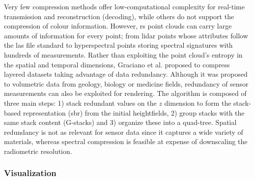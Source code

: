 Very few compression methods offer low-computational complexity for real-time transmission \cite{cao_3d_2019} and reconstruction (decoding), while others do not support the compression of colour information. However, \acrshort{rs} point clouds can carry large amounts of information for every point; from \acrshort{lidar} points whose attributes follow the \acrshort{las} file standard to hyperspectral points storing spectral signatures with hundreds of measurements. Rather than exploiting the point cloud's entropy in the spatial and temporal dimensions, Graciano et al. \cite{graciano_quadstack_2021} proposed to compress layered datasets taking advantage of data redundancy. Although it was proposed to volumetric data from geology, biology or medicine fields, redundancy of sensor measurements can also be exploited for rendering. The algorithm is composed of three main steps: 1) stack redundant values on the $\textit{z}$ dimension to form the stack-based representation (\acrshort{sbr}) from the initial heightfields, 2) group stacks with the same stack content (G-stacks) and 3) organize these into a quad-tree. Spatial redundancy is not as relevant for sensor data since it captures a wide variety of materials, whereas spectral compression is feasible at expense of downscaling the radiometric resolution. 

\subsubsection{Visualization}


